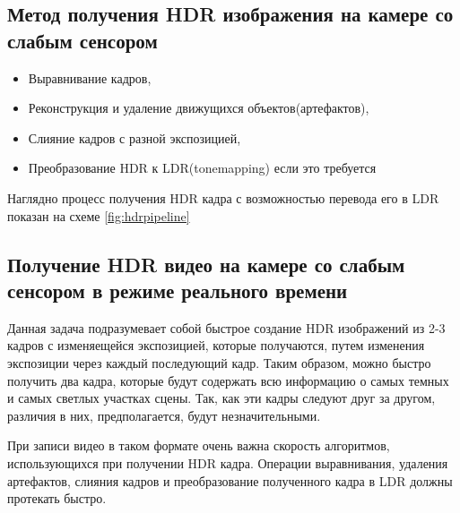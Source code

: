 \subsection { Метод получения HDR изображения на камере со слабым сенсором}
\begin{itemize}
    \item Выравнивание кадров,
    \item Реконструкция и удаление движущихся объектов(артефактов),
    \item Слияние кадров с разной экспозицией,
    \item Преобразование HDR к LDR(tonemapping) если это требуется
\end{itemize}

Наглядно процесс получения HDR кадра с возможностью перевода его в LDR показан на схеме\cite{bib3} \ref{fig:hdrpipeline}

\begin{figure}[ht!]
\end{figure}

\subsection{ Получение HDR видео на камере со слабым сенсором в режиме реального времени}
    
    Данная задача подразумевает собой быстрое создание HDR изображений из 2-3 кадров с изменяещейся экспозицией, которые получаются, путем изменения экспозиции через каждый последующий кадр. Таким образом, можно быстро получить два кадра, которые будут содержать всю информацию о самых темных и самых светлых участках сцены. Так, как эти кадры следуют друг за другом, различия в них, предполагается, будут незначительными.

    При записи видео в таком формате очень важна скорость алгоритмов, использующихся при получении HDR кадра. Операции выравнивания, удаления артефактов, слияния кадров и преобразование полученного кадра в LDR должны протекать быстро.

